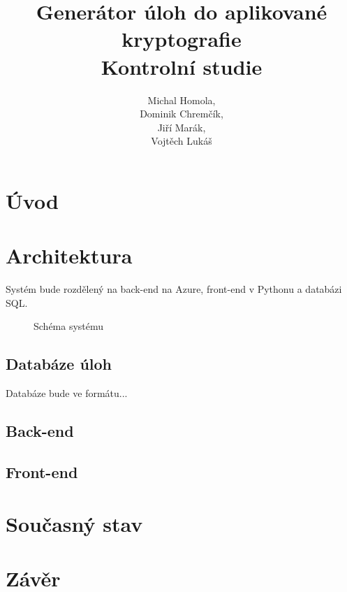 \documentclass[titlepage]{article}
\title{Generátor úloh do aplikované kryptografie\\Kontrolní studie}
\author{Michal Homola,\\Dominik Chremčík,\\Jiří Marák,\\Vojtěch Lukáš}
\begin{document}
\maketitle

\tableofcontents

\section*{Úvod}

\section{Architektura}
Systém bude rozdělený na back-end na Azure, front-end v Pythonu a databázi SQL. 
\begin{figure}[h!]
    \centering
        
    \caption{Schéma systému}
    \label{fig:sys}
\end{figure}


\subsection{Databáze úloh}
Databáze bude ve formátu...

\subsection{Back-end}

\subsection{Front-end}

\section{Současný stav}

\section*{Závěr}
\end{document}
